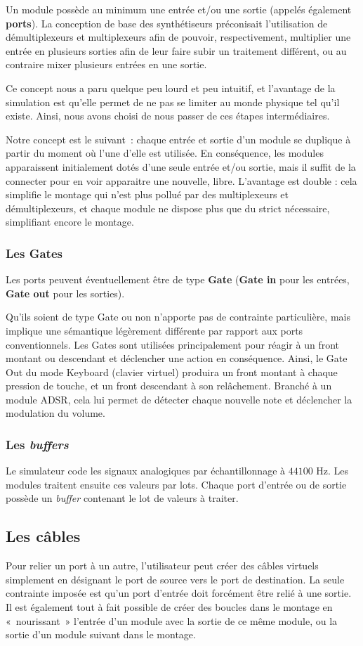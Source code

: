Un module possède au minimum une entrée et/ou une sortie (appelés
également \textbf{ports}). La conception de base des synthétiseurs
préconisait l'utilisation de démultiplexeurs et multiplexeurs afin
de pouvoir, respectivement, multiplier une entrée en plusieurs
sorties afin de leur faire subir un traitement différent, ou au
contraire mixer plusieurs entrées en une sortie.

Ce concept nous a paru quelque peu lourd et peu intuitif, et
l'avantage de la simulation est qu'elle permet de
ne pas se limiter au monde physique tel qu'il existe. Ainsi, nous
avons choisi de nous passer de ces étapes intermédiaires.

Notre concept est le suivant~: chaque entrée et sortie d'un module
se duplique à partir du moment où l'une d'elle est utilisée. En
conséquence, les modules apparaissent initialement dotés d'une
seule entrée et/ou sortie, mais il suffit de la connecter
pour en voir apparaitre une nouvelle, libre. L'avantage est double
: cela simplifie le montage qui n'est plus pollué par des
multiplexeurs et démultiplexeurs, et chaque module ne dispose plus
que du strict nécessaire, simplifiant encore le montage.

\subsubsection{Les Gates}

Les ports peuvent éventuellement être de type \textbf{Gate} (\textbf{Gate
in} pour les entrées, \textbf{Gate out} pour les sorties).

Qu'ils soient de type Gate ou non n'apporte pas de contrainte
particulière, mais implique une sémantique légèrement différente
par rapport aux ports conventionnels. Les Gates sont utilisées
principalement pour réagir à un front montant ou descendant et
déclencher une action en conséquence. Ainsi, le Gate Out du mode
Keyboard (clavier virtuel) produira un front montant à chaque
pression de touche, et un front descendant à son relâchement.
Branché à un module ADSR, cela lui permet de détecter chaque
nouvelle note et déclencher la modulation du volume.

\subsubsection{Les \emph{buffers}}

Le simulateur code les signaux analogiques par échantillonnage à $44100$ Hz. Les modules
traitent ensuite ces valeurs par lots. Chaque port d’entrée ou de sortie possède un
\emph{buffer} contenant le lot de valeurs à traiter.

\subsection{Les câbles}

Pour relier un port à un autre, l'utilisateur peut créer des câbles
virtuels simplement en désignant le port de source vers le port de
destination. La seule contrainte imposée est qu'un port d'entrée
doit forcément être relié à une sortie. Il est également tout à
fait possible de créer des boucles dans le montage en
«~nourissant~» l'entrée d'un module avec la sortie de ce même
module, ou la sortie d'un module suivant dans le montage.
